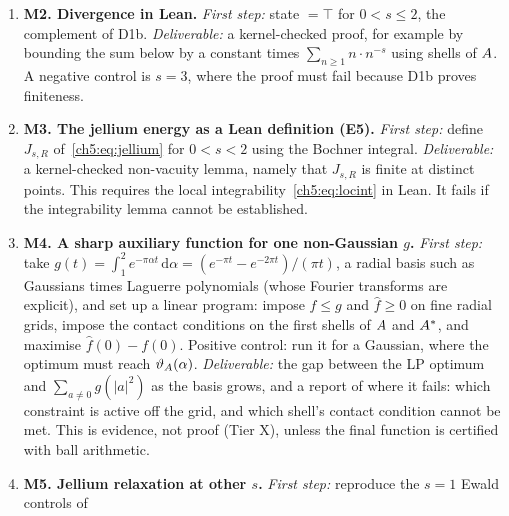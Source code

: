 \begin{enumerate}[leftmargin=*,label=\textbf{\arabic*.}]
  Mathlib's Gamma-integral lemmas. In the Mathlib checkout used by this repository's \texttt{formal/} directory,
   states
  $\int_{t>0}t^{a-1}e^{-rt}\,\mathrm{d}t=(1/r)^a\,\Gamma(a)$ for $a,r>0$. Check that it exists in Mathlib
  d13f23b7 before relying on it. \emph{Deliverable:} a kernel-checked proof that
  $t^{-s/2}=\Gamma(s/2)^{-1}\int_0^\infty u^{s/2-1}e^{-tu}\,\mathrm{d}u$ for $t,s>0$, and the positivity transfer: if
  $h\ge0$ is integrable against $t^{-s/2}$, the integral is $\ge0$. Gate it as in Chapter~2: axiom audit, and a
  planted \texttt{sorry} control that the audit flags.
\item \textbf{M2. Divergence in Lean.} \emph{First step:} state  $=\top$ for
  $0<s\le2$, the complement of D1b. \emph{Deliverable:} a kernel-checked proof, for example by bounding the sum
  below by a constant times $\sum_{n\ge1}n\cdot n^{-s}$ using shells of $A$. A negative control is
  $s=3$, where the proof must fail because D1b proves finiteness.
\item \textbf{M3. The jellium energy as a Lean definition (E5).} \emph{First step:} define $J_{s,R}$
  of~\eqref{ch5:eq:jellium} for $0<s<2$ using the Bochner integral. \emph{Deliverable:} a kernel-checked non-vacuity
  lemma, namely that $J_{s,R}$ is finite at distinct points. This requires the local integrability~\eqref{ch5:eq:locint}
  in Lean. It fails if the integrability lemma cannot be established.
\item \textbf{M4. A sharp auxiliary function for one non-Gaussian $g$.} \emph{First step:} take
  $g(t)=\int_1^2e^{-\pi\alpha t}\,\mathrm{d}\alpha=(e^{-\pi t}-e^{-2\pi t})/(\pi t)$, a radial basis such as Gaussians
  times Laguerre polynomials (whose Fourier transforms are explicit), and set up a linear program: impose
  $f\le g$ and $\hat f\ge0$ on fine radial grids, impose the contact conditions on the first shells of $A$ and
  $A^*$, and maximise $\hat f(0)-f(0)$. Positive control: run it for a Gaussian, where the optimum must reach
  $\vartheta_A(\alpha)$. \emph{Deliverable:} the gap between the LP optimum and $\sum_{a\ne0}g(|a|^2)$ as the basis
  grows, and a report of where it fails: which constraint is active off the grid, and which shell's contact
  condition cannot be met. This is evidence, not proof (Tier X), unless the final function is certified with ball
  arithmetic.
\item \textbf{M5. Jellium relaxation at other $s$.} \emph{First step:} reproduce the $s=1$ Ewald controls of

\end{enumerate}
